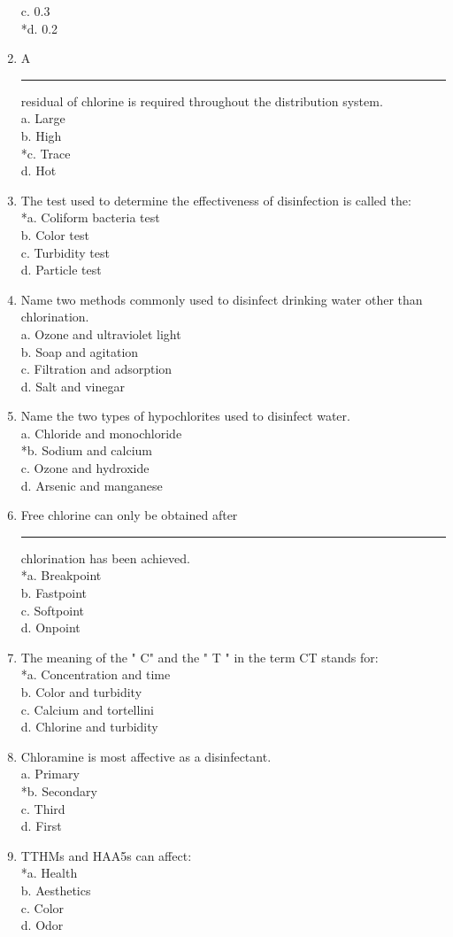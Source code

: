 \begin{enumerate}[1.]
c. 0.3\\
*d. 0.2\\
\item A \rule{1.5cm}{0.5pt} residual of chlorine is required throughout the distribution system.\\
a. Large\\
b. High\\
*c. Trace\\
d. Hot\\
\item The test used to determine the effectiveness of disinfection is called the:\\
*a. Coliform bacteria test\\
b. Color test\\
c. Turbidity test\\
d. Particle test\\
\item Name two methods commonly used to disinfect drinking water other than chlorination.\\
a. Ozone and ultraviolet light\\
b. Soap and agitation\\
c. Filtration and adsorption\\
d. Salt and vinegar\\
\item Name the two types of hypochlorites used to disinfect water.\\
a. Chloride and monochloride\\
*b. Sodium and calcium\\
c. Ozone and hydroxide\\
d. Arsenic and manganese\\
\item Free chlorine can only be obtained after \rule{1.5cm}{0.5pt} chlorination has been achieved.\\
*a. Breakpoint\\
b. Fastpoint\\
c. Softpoint\\
d. Onpoint\\
\item The meaning of the " C" and the " T " in the term CT stands for:\\
*a. Concentration and time\\
b. Color and turbidity\\
c. Calcium and tortellini\\
d. Chlorine and turbidity\\
\item Chloramine is most affective as a disinfectant.\\
a. Primary\\
*b. Secondary\\
c. Third\\
d. First\\
\item TTHMs and HAA5s can affect:\\
*a. Health\\
b. Aesthetics\\
c. Color\\
d. Odor\\


\end{enumerate}
